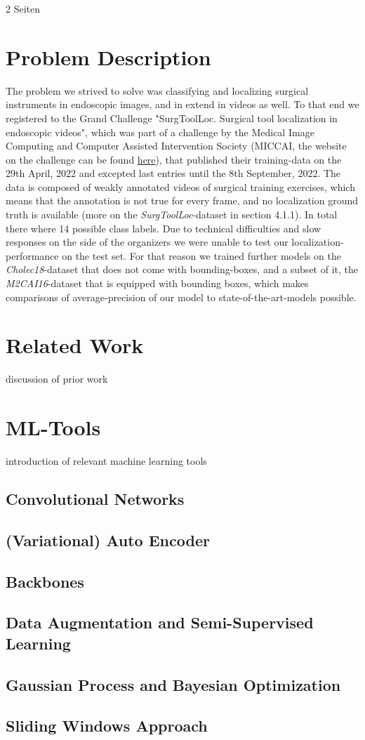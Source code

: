 2 Seiten

\section{Problem Description}
The problem we strived to solve was classifying and localizing surgical instruments in endoscopic images, and in extend in videos as well. 
To that end we registered to the Grand Challenge "SurgToolLoc. Surgical tool localization in endoscopic videos", which was part of a challenge by the Medical Image Computing and Computer Assisted Intervention Society (MICCAI, the website on the challenge can be found \href{https://surgtoolloc.grand-challenge.org}{here}), that published their training-data on the 29th April, 2022 and excepted last entries until the 8th September, 2022. The data is composed of weakly annotated videos of surgical training exercises, which means that the annotation is not true for every frame, and no localization ground truth is available (more on the \textit{SurgToolLoc}-dataset in section 4.1.1). In total there where 14 possible class labels. Due to technical difficulties and slow responses on the side of the organizers we were unable to test our localization-performance on the test set. For that reason we trained further models on the \textit{Cholec18}-dataset that does not come with bounding-boxes, and a subset of it, the \textit{M2CAI16}-dataset that is equipped with bounding boxes, which makes comparisons of average-precision of our model to state-of-the-art-models possible.

\section{Related Work}
discussion of prior work

\section{ML-Tools}
introduction of relevant machine learning tools

\subsection{Convolutional Networks}
\subsection{(Variational) Auto Encoder}
\subsection{Backbones}
\subsection{Data Augmentation and Semi-Supervised Learning}
\subsection{Gaussian Process and Bayesian Optimization}
\subsection{Sliding Windows Approach}
